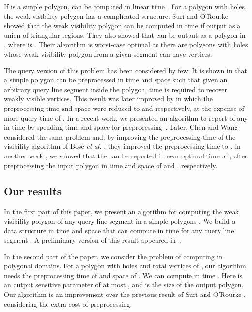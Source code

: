 \documentclass[5p]{elsarticle}
\begin{document}
If  is a simple polygon,  can be computed in linear time \cite{guibas,toussainta}.
For a polygon with holes, the weak visibility polygon has a complicated structure.
Suri and O'Rourke \cite{suri} 
showed that the weak visibility polygon can be computed in  time
if output as a union of  triangular regions. They also showed that
 can be output as a polygon in , where  is .
Their algorithm is worst-case optimal as there are polygons with holes whose weak visibility 
polygon from a given segment can have  vertices.

The query version of this problem has been considered by few.
It is shown in \cite{bose} that a simple polygon  can be preprocessed 
in  time and  space
such that given an arbitrary query line segment inside the polygon, 
 time is required to recover  weakly visible vertices.
This result was later improved by \cite{aronov} in which the preprocessing time and space were 
reduced to  and  respectively, at the expense of more query 
time of .
In a recent work, we presented an algorithm to report 
of any  in  time by spending 
time and   space for preprocessing~\cite{nouri}.
Later, Chen and Wang considered the same problem and, by improving the 
preprocessing time of the visibility algorithm of Bose {\em et al.} \cite{bose},
they improved the preprocessing time to  \cite{chen2}.
In another work \cite{nouri2}, we showed that the  
can be reported in near optimal time of , 
after preprocessing the input polygon in time and space of 
and , respectively. 



\subsection{Our results}

In the first part of this paper, we present an algorithm for computing the weak visibility 
polygon of any query line segment in a simple polygons .
We build a data structure in  time and  space that can compute 
  in  time for any query line segment .
A preliminary version of this result appeared in~\cite{nouri}.

In the second part of the paper, we consider the problem of computing  in polygonal domains.
For a polygon with  holes and total vertices of , our algorithm needs the preprocessing
time of  and space of . 
We can compute  in time . 
Here  is an output sensitive parameter of at most ,
and  is the size of the output polygon. 
Our algorithm is an improvement over the previous result of Suri and O'Rourke \cite{suri},
considering the extra cost of preprocessing.
\end{document}
